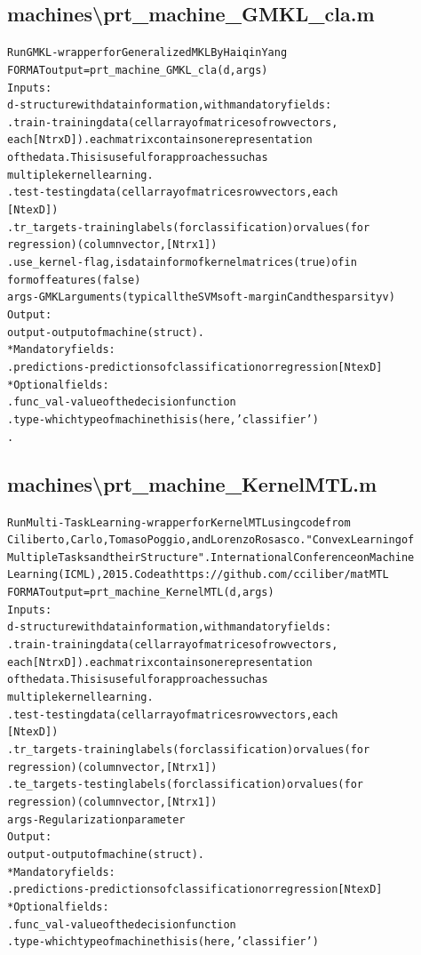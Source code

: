 \subsection{machines\textbackslash prt\_machine\_GMKL\_cla.m}
\begin{alltt}

 Run GMKL - wrapper for Generalized MKL By Haiqin Yang
 FORMAT output = prt\_machine\_GMKL\_cla(d,args)
 Inputs:
   d         - structure with data information, with mandatory fields:
     .train      - training data (cell array of matrices of row vectors,
                   each [Ntr x D]). each matrix contains one representation
                   of the data. This is useful for approaches such as
                   multiple kernel learning.
     .test       - testing data  (cell array of matrices row vectors, each
                   [Nte x D])
     .tr\_targets - training labels (for classification) or values (for
                   regression) (column vector, [Ntr x 1])
     .use\_kernel - flag, is data in form of kernel matrices (true) of in 
                form of features (false)
    args     - GMKL arguments (typicall the SVM soft-margin C and the sparsity v)
 Output:
    output  - output of machine (struct).
     * Mandatory fields:
      .predictions - predictions of classification or regression [Nte x D]
     * Optional fields:
      .func\_val - value of the decision function
      .type     - which type of machine this is (here, 'classifier')
      .
\end{alltt}


\subsection{machines\textbackslash prt\_machine\_KernelMTL.m}
\begin{alltt}

 Run Multi-Task Learning - wrapper for Kernel MTL using code from
Ciliberto, Carlo, Tomaso Poggio, and Lorenzo Rosasco. "Convex Learning of
Multiple Tasks and their Structure". International Conference on Machine 
Learning (ICML), 2015. Code at https://github.com/cciliber/matMTL
 FORMAT output = prt\_machine\_KernelMTL(d,args)
 Inputs:
   d         - structure with data information, with mandatory fields:
     .train      - training data (cell array of matrices of row vectors,
                   each [Ntr x D]). each matrix contains one representation
                   of the data. This is useful for approaches such as
                   multiple kernel learning.
     .test       - testing data  (cell array of matrices row vectors, each
                   [Nte x D])
     .tr\_targets - training labels (for classification) or values (for
                   regression) (column vector, [Ntr x 1])
     .te\_targets - testing labels (for classification) or values (for
                   regression) (column vector, [Ntr x 1])
    args         - Regularization parameter
 Output:
    output  - output of machine (struct).
     * Mandatory fields:
      .predictions - predictions of classification or regression [Nte x D]
     * Optional fields:
      .func\_val - value of the decision function
      .type     - which type of machine this is (here, 'classifier')
\end{alltt}


